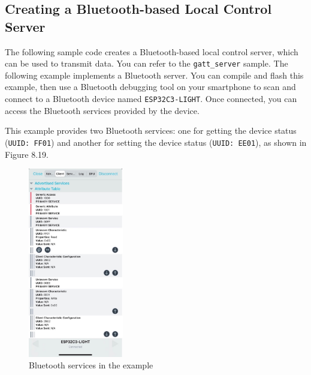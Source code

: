 \documentclass[a4paper,12pt,openany]{book}
\renewcommand{\ttfamily}{\fontfamily{pcr}\selectfont}
\renewcommand{\arraystretch}{1}
\newenvironment{codebloc}{ %
    \ttfamily\footnotesize
    \renewcommand{\arraystretch}{1}
}
\newcommand{\note}[2][NOTE]{ %
\vspace{6pt}
\begin{tabular}{b{\textwidth}}
\hline
\fontfamily{phv}\selectfont \textbf{#1}\\
\leftskip 1em #2\\
\hline
\end{tabular}
}
\begin{document}

\subsection{Creating a Bluetooth-based Local Control Server}
The following sample code creates a Bluetooth-based local control server, which can be used to transmit data. You can refer to the \verb|gatt_server| sample. The following example implements a Bluetooth server. You can compile and flash this example, then use a Bluetooth debugging tool on your smartphone to scan and connect to a Bluetooth device named \verb|ESP32C3-LIGHT|. Once connected, you can access the Bluetooth services provided by the device.


This example provides two Bluetooth services: one for getting the device status (\verb|UUID: FF01|) and another for setting the device status (\verb|UUID: EE01|), as shown in Figure 8.19.

\begin{figure}[!h]
    \centering
    \includegraphics[width=0.37\textwidth]{D8Z/8-19}
    \caption{Bluetooth services in the example}
\end{figure}
\end{document}
